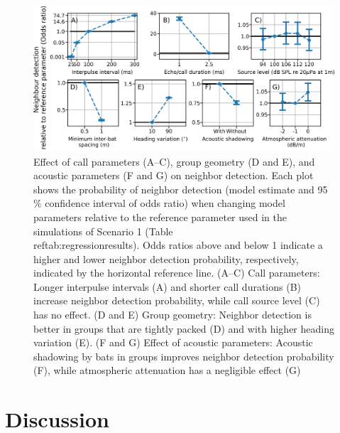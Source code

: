 \documentclass[
]{book}
\begin{document}
\begin{figure}[!htbp]
\includegraphics[]{original_papers/CPN_figures/Figure_4/Figure4_oddsratio_comparison.png}
\centering
\caption{Effect of call parameters (A–C), group geometry (D and E), and acoustic parameters (F and G) on neighbor detection. Each plot shows the probability of neighbor detection (model estimate and 95$\%$ confidence interval of odds ratio) when changing model parameters relative to the reference parameter used in the simulations of Scenario 1 (Table \\ref{tab:regressionresults}). Odds ratios above and below 1 indicate a higher and lower neighbor detection probability, respectively, indicated by the horizontal reference line. (A–C) Call parameters: Longer interpulse intervals (A) and shorter call durations (B) increase neighbor detection probability, while call source level (C) has no effect. (D and E) Group geometry: Neighbor detection is better in groups that are tightly packed (D) and with higher heading variation (E). (F and G) Effect of acoustic parameters: Acoustic shadowing by bats in groups improves neighbor detection probability (F), while atmospheric attenuation has a negligible effect (G)} 
\label{cpn_fig4}
\end{figure}

\hypertarget{discussion}{%
\section{Discussion}\label{discussion}}
\end{document}
